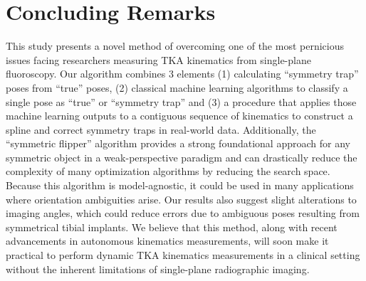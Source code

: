 \section{Concluding Remarks}
This study presents a novel method of overcoming one of the most pernicious issues facing researchers measuring TKA kinematics from single-plane fluoroscopy.
Our algorithm combines 3 elements (1) calculating “symmetry trap” poses from “true” poses, (2) classical machine learning algorithms to classify a single pose as “true” or “symmetry trap” and (3) a procedure that applies those machine learning outputs to a contiguous sequence of kinematics to construct a spline and correct symmetry traps in real-world data.
Additionally, the “symmetric flipper” algorithm provides a strong foundational approach for any symmetric object in a weak-perspective paradigm and can drastically reduce the complexity of many optimization algorithms by reducing the search space.
Because this algorithm is model-agnostic, it could be used in many applications where orientation ambiguities arise.
Our results also suggest slight alterations to imaging angles, which could reduce errors due to ambiguous poses resulting from symmetrical tibial implants.
We believe that this method, along with recent advancements in autonomous kinematics measurements, will soon make it practical to perform dynamic TKA kinematics measurements in a clinical setting without the inherent limitations of single-plane radiographic imaging.


